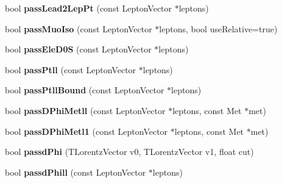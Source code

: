 \begin{DoxyCompactItemize}
\item 
\hypertarget{classSusySelection_af46c8fd35547ae21d73db2c5bbcc0697}{
bool {\bfseries passLead2LepPt} (const LeptonVector $\ast$leptons)}
\label{classSusySelection_af46c8fd35547ae21d73db2c5bbcc0697}

\item 
\hypertarget{classSusySelection_a7f5e13d0fe73c8d1d4995ef9835cd52c}{
bool {\bfseries passMuoIso} (const LeptonVector $\ast$leptons, bool useRelative=true)}
\label{classSusySelection_a7f5e13d0fe73c8d1d4995ef9835cd52c}

\item 
\hypertarget{classSusySelection_a77220b086659528a43d317d64da3a98f}{
bool {\bfseries passEleD0S} (const LeptonVector $\ast$leptons)}
\label{classSusySelection_a77220b086659528a43d317d64da3a98f}

\item 
\hypertarget{classSusySelection_a40489f26ecbc15fa815ca9fb39e28b83}{
bool {\bfseries passPtll} (const LeptonVector $\ast$leptons)}
\label{classSusySelection_a40489f26ecbc15fa815ca9fb39e28b83}

\item 
\hypertarget{classSusySelection_a9b4876b736fb9b3e4b3c1433d5fa4041}{
bool {\bfseries passPtllBound} (const LeptonVector $\ast$leptons)}
\label{classSusySelection_a9b4876b736fb9b3e4b3c1433d5fa4041}

\item 
\hypertarget{classSusySelection_a11ad872e9954d0b691eeb76cbb14bf21}{
bool {\bfseries passDPhiMetll} (const LeptonVector $\ast$leptons, const Met $\ast$met)}
\label{classSusySelection_a11ad872e9954d0b691eeb76cbb14bf21}

\item 
\hypertarget{classSusySelection_a04718f3f91b54c806e1cbcf6690f11bf}{
bool {\bfseries passDPhiMetl1} (const LeptonVector $\ast$leptons, const Met $\ast$met)}
\label{classSusySelection_a04718f3f91b54c806e1cbcf6690f11bf}

\item 
\hypertarget{classSusySelection_ab58ab677b132b95ffd499f5aaeef0ec5}{
bool {\bfseries passdPhi} (TLorentzVector v0, TLorentzVector v1, float cut)}
\label{classSusySelection_ab58ab677b132b95ffd499f5aaeef0ec5}

\item 
\hypertarget{classSusySelection_a600f722df5dc953eff6fe69532196e94}{
bool {\bfseries passdPhill} (const LeptonVector $\ast$leptons)}
\label{classSusySelection_a600f722df5dc953eff6fe69532196e94}


\end{DoxyCompactItemize}
